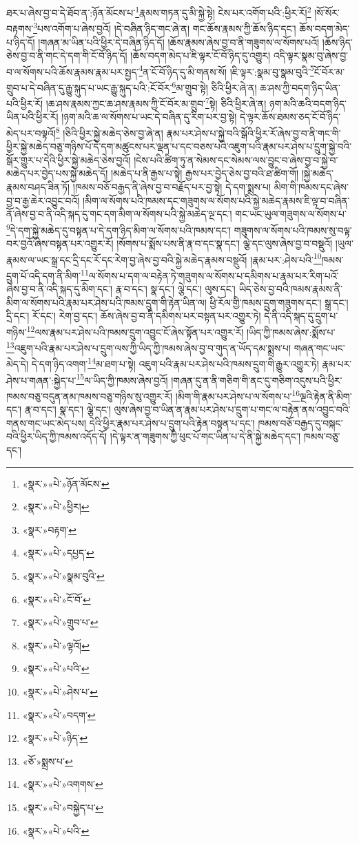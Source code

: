 ཐར་པ་ཞེས་བྱ་བ་དེ་ཐོབ་ན་:ཉོན་མོངས་པ་\footnote{«སྣར་»«པེ་»ཉོན་མོངས་}རྣམས་གཏན་དུ་མི་སྐྱེ་སྟེ། ངེས་པར་འགོག་པའི་:ཕྱིར་རོ།\footnote{«སྣར་»«པེ་»ཕྱིར།} །སོ་སོར་བརྟགས་\footnote{«སྣར་»བརྟག་}པས་འགོག་པ་ཞེས་བྱའོ། །དེ་བཞིན་ཉིད་གང་ཞེ་ན། གང་ཆོས་རྣམས་ཀྱི་ཆོས་ཉིད་དང་། ཆོས་བདག་མེད་པ་ཉིད་དོ། །གཞན་མ་ཡིན་པའི་ཕྱིར་དེ་བཞིན་ཉིད་དོ། །ཆོས་རྣམས་ཞེས་བྱ་བ་ནི་གཟུགས་ལ་སོགས་པའོ། །ཆོས་ཉིད་ཅེས་བྱ་བ་ནི་གང་དེ་དག་གི་ངོ་བོ་ཉིད་དོ། །ཆོས་བདག་མེད་པ་ཇི་ལྟར་ངོ་བོ་ཉིད་དུ་འགྱུར། འདི་ལྟར་སྣམ་བུ་ཞེས་བྱ་བ་ལ་སོགས་པའི་ཆོས་རྣམས་རྣམ་པར་སྤྱད་\footnote{«སྣར་»«པེ་»དཔྱད་}ན་ངོ་བོ་ཉིད་དུ་མི་གནས་སོ། །ཇི་ལྟར་:སྣམ་བུ་སྣམ་བུའི་\footnote{«སྣར་»«པེ་»སྣམ་བུའི་}ངོ་བོར་མ་གྲུབ་པ་དེ་བཞིན་དུ་རྒྱུ་སྐུད་པ་ཡང་རྒྱུ་སྐུད་པའི་:ངོ་བོར་\footnote{«སྣར་»«པེ་»ངོ་བོ་}མ་གྲུབ་སྟེ། ཅིའི་ཕྱིར་ཞེ་ན། ཆ་ཤས་ཀྱི་བདག་ཉིད་ཡིན་པའི་ཕྱིར་རོ། །ཆ་ཤས་རྣམས་ཀྱང་ཆ་ཤས་རྣམས་ཀྱི་ངོ་བོར་མ་གྲུབ་\footnote{«སྣར་»«པེ་»གྲུབ་པ་}སྟེ། ཅིའི་ཕྱིར་ཞེ་ན། ཉག་མའི་ཆའི་བདག་ཉིད་ཡིན་པའི་ཕྱིར་རོ། །ཉག་མའི་ཆ་ལ་སོགས་པ་ཡང་དེ་བཞིན་དུ་རིག་པར་བྱ་སྟེ། དེ་ལྟར་ཆོས་ཐམས་ཅད་ངོ་བོ་ཉིད་མེད་པར་བལྟའོ།\footnote{«སྣར་»«པེ་»ལྟའོ།} །ཅིའི་ཕྱིར་སྐྱེ་མཆེད་ཅེས་བྱ་ཞེ་ན། རྣམ་པར་ཤེས་པ་སྐྱེ་བའི་སྒོའི་ཕྱིར་རོ་ཞེས་བྱ་བ་ནི་གང་གི་ཕྱིར་སྐྱེ་མཆེད་བཅུ་གཉིས་པོ་དེ་དག་མཚུངས་པར་ལྡན་པ་དང་བཅས་པའི་འཇུག་པའི་རྣམ་པར་ཤེས་པ་དྲུག་སྐྱེ་བའི་སྒོར་གྱུར་པ་དེའི་ཕྱིར་སྐྱེ་མཆེད་ཅེས་བྱའོ། །ངེས་པའི་ཚིག་ཏུ་ན་སེམས་དང་སེམས་ལས་བྱུང་བ་ཞེས་བྱ་བ་སྐྱེ་བ་མཆེད་པར་བྱེད་པས་སྐྱེ་མཆེད་དོ། །མཆེད་པ་ནི་རྒྱས་པ་སྟེ། རྒྱས་པར་བྱེད་ཅེས་བྱ་བའི་ཐ་ཚིག་གོ། །སྐྱེ་མཆེད་རྣམས་བཤད་ཟིན་ཏོ། །ཁམས་བཅོ་བརྒྱད་ནི་ཞེས་བྱ་བ་བརྗོད་པར་བྱ་སྟེ། དེ་དག་སྨྲས་པ། མིག་གི་ཁམས་དང་ཞེས་བྱ་བ་རྒྱ་ཆེར་འབྱུང་བའོ། །མིག་ལ་སོགས་པའི་ཁམས་དང་གཟུགས་ལ་སོགས་པའི་སྐྱེ་མཆེད་རྣམས་ཇི་ལྟ་བ་བཞིན་ནོ་ཞེས་བྱ་བ་ནི་འདི་སྐད་དུ་གང་དག་མིག་ལ་སོགས་པའི་སྐྱེ་མཆེད་ལྔ་དང་། གང་ཡང་ཡུལ་གཟུགས་ལ་སོགས་པ་\footnote{«སྣར་»«པེ་»པའི་}དེ་དག་སྐྱེ་མཆེད་དུ་བསྟན་པ་དེ་དག་ཉིད་མིག་ལ་སོགས་པའི་ཁམས་དང་། གཟུགས་ལ་སོགས་པའི་ཁམས་སུ་བལྟ་བར་བྱའོ་ཞེས་བསྟན་པར་འགྱུར་རོ། །སོགས་པ་སྨོས་པས་ནི་རྣ་བ་དང་སྣ་དང་། ལྕེ་དང་ལུས་ཞེས་བྱ་བ་བསྡུའོ། །ཡུལ་རྣམས་ལ་ཡང་སྒྲ་དང་དྲི་དང་རོ་དང་རེག་བྱ་ཞེས་བྱ་བའི་སྐྱེ་མཆེད་རྣམས་བསྡུའོ། །རྣམ་པར་:ཤེས་པའི་\footnote{«སྣར་»«པེ་»ཤེས་པ་}ཁམས་དྲུག་པོ་འདི་དག་ནི་མིག་\footnote{«སྣར་»«པེ་»བདག་}ལ་སོགས་པ་དག་ལ་བརྟེན་ཏེ་གཟུགས་ལ་སོགས་པ་དམིགས་པ་རྣམ་པར་རིག་པའོ་ཞེས་བྱ་བ་ནི་འདི་སྐད་དུ་མིག་དང་། རྣ་བ་དང་། སྣ་དང་། ལྕེ་དང་། ལུས་དང་། ཡིད་ཅེས་བྱ་བའི་ཁམས་རྣམས་ནི་མིག་ལ་སོགས་པའི་རྣམ་པར་ཤེས་པའི་ཁམས་དྲུག་གི་རྟེན་ཡིན་ལ། ཕྱི་རོལ་གྱི་ཁམས་དྲུག་གཟུགས་དང་། སྒྲ་དང་། དྲི་དང་། རོ་དང་། རེག་བྱ་དང་། ཆོས་ཞེས་བྱ་བ་ནི་དམིགས་པར་བསྟན་པར་འགྱུར་ཏེ། དེ་ནི་འདི་སྐད་དུ་དྲུག་པ་གཉིས་\footnote{«སྣར་»«པེ་»ཉིད་}ལས་རྣམ་པར་ཤེས་པའི་ཁམས་དྲུག་འབྱུང་ངོ་ཞེས་སྟོན་པར་འགྱུར་རོ། །ཡིད་ཀྱི་ཁམས་ཞེས་:སྨོས་པ་\footnote{«ཅོ་»སྨྲས་པ་}འཇུག་པའི་རྣམ་པར་ཤེས་པ་དྲུག་ལས་ཀྱི་ཡིད་ཀྱི་ཁམས་ཞེས་བྱ་བ་གུད་ན་ཡོད་དམ་སྨྲས་པ། གཞན་གང་ཡང་མེད་དེ། དེ་དག་ཉིད་འགག་\footnote{«སྣར་»«པེ་»འགགས་}མ་ཐག་པ་སྟེ། འཇུག་པའི་རྣམ་པར་ཤེས་པའི་ཁམས་དྲུག་གི་རྒྱུར་འགྱུར་ཏེ། རྣམ་པར་ཤེས་པ་གཞན་:སྐྱེད་པ་\footnote{«སྣར་»«པེ་»བསྐྱེད་པ་}ལ་ཡིད་ཀྱི་ཁམས་ཞེས་བྱའོ། །གཞན་དུ་ན་ནི་གཅིག་གི་ནང་དུ་གཅིག་འདུས་པའི་ཕྱིར་ཁམས་བཅུ་བདུན་ནམ་ཁམས་བཅུ་གཉིས་སུ་འགྱུར་རོ། །མིག་གི་རྣམ་པར་ཤེས་པ་ལ་སོགས་པ་\footnote{«སྣར་»«པེ་»པའི་}ལྔའི་རྟེན་ནི་མིག་དང་། རྣ་བ་དང་། སྣ་དང་། ལྕེ་དང་། ལུས་ཞེས་བྱ་བ་ཡིན་ན་རྣམ་པར་ཤེས་པ་དྲུག་པ་གང་ལ་བརྟེན་ནས་འབྱུང་བའི་གནས་གང་ཡང་མེད་པས། དེའི་ཕྱིར་རྣམ་པར་ཤེས་པ་དྲུག་པའི་རྟེན་བསྟན་པ་དང་། ཁམས་བཅོ་བརྒྱད་དུ་བསྐང་བའི་ཕྱིར་ཡིད་ཀྱི་ཁམས་འདོད་དོ། །དེ་ལྟར་ན་གཟུགས་ཀྱི་ཕུང་པོ་གང་ཡིན་པ་དེ་ནི་སྐྱེ་མཆེད་དང་། ཁམས་བཅུ་དང་། 